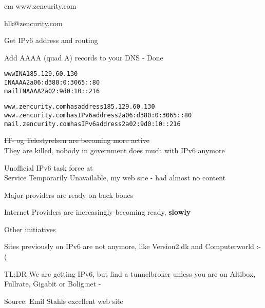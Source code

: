 \documentclass[20pt,landscape,a4paper,footrule]{foils}
\begin{document}

\begin{center}
 cm
\hlkbig
www.zencurity.com

hlk@zencurity.com
\end{center}


\begin{list1}
\item Get IPv6 address and routing
\item Add AAAA (quad A) records to your DNS - Done
\end{list1}

\begin{alltt}
www     IN A       185.129.60.130
        IN AAAA    2a06:d380:0:3065::80
mail    IN AAAA    2a02:9d0:10::216

www.zencurity.com has address 185.129.60.130
www.zencurity.com has IPv6 address 2a06:d380:0:3065::80
mail.zencurity.com has IPv6 address 2a02:9d0:10::216
\end{alltt}






\begin{list1}
\item \sout{IT- og Telestyrelsen are becoming more active}\\
They are killed, nobody in government does much with IPv6 anymore
\item Unofficial IPv6 task force at \\
Service Temporarily Unavailable, my web site - had almost no content
\item Major providers are ready on back bones
\item Internet Providers are increasingly becoming ready, {\bf slowly}
\item Other initiatives 
\item Sites previously on IPv6 are not anymore, like Version2.dk and Computerworld :-(
\end{list1}

TL;DR We are getting IPv6, but find a tunnelbroker unless you are on Altibox, Fullrate, Gigabit or Bolig:net - 


Source:  Emil Stahls excellent web site
\end{document}
